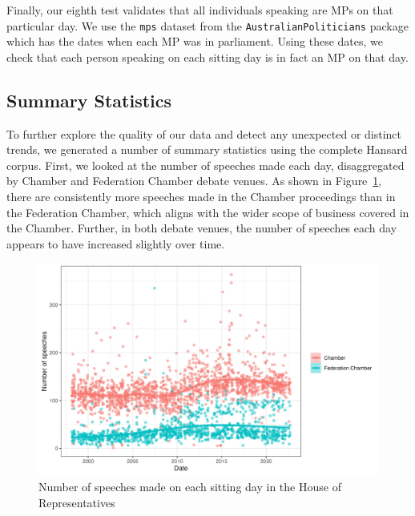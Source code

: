 \documentclass[
  letterpaper,
  DIV=11,
  numbers=noendperiod]{scrartcl}
\begin{document}
Finally, our eighth test validates that all individuals speaking are MPs
on that particular day. We use the \texttt{mps} dataset from the
\texttt{AustralianPoliticians} package which has the dates when each MP
was in parliament. Using these dates, we check that each person speaking
on each sitting day is in fact an MP on that day.

\hypertarget{summary-statistics}{%
\subsection{Summary Statistics}\label{summary-statistics}}

To further explore the quality of our data and detect any unexpected or
distinct trends, we generated a number of summary statistics using the
complete Hansard corpus. First, we looked at the number of speeches made
each day, disaggregated by Chamber and Federation Chamber debate venues.
As shown in Figure~\ref{fig-dailyspeeches}, there are consistently more
speeches made in the Chamber proceedings than in the Federation Chamber,
which aligns with the wider scope of business covered in the Chamber.
Further, in both debate venues, the number of speeches each day appears
to have increased slightly over time.

\begin{figure}

{\centering \includegraphics[width=4.58333in,height=\textheight]{n_daily_speeches.jpg}

}

\caption{\label{fig-dailyspeeches}Number of speeches made on each
sitting day in the House of Representatives}

\end{figure}
\end{document}
